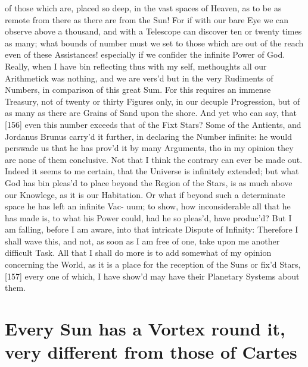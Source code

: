 \documentclass[letterpaper]{book}
\begin{document}
of those which are, placed so deep, in the vast spaces of Heaven, as to be
as remote from there as there are from the Sun! For if with our bare Eye
we can observe above a thousand, and with a Telescope can discover ten or
twenty times as many; what bounds of number must we set to those which
are out of the reach even of these Assistances! especially if we confider
the infinite Power of God. Really, when I have bin reflecting thus with my
self, methoughts all our Arithmetick was nothing, and we are vers'd but
in the very Rudiments of Numbers, in comparison of this great Sum. For
this requires an immense Treasury, not of twenty or thirty Figures only, in
our decuple Progression, but of as many as there are Grains of Sand upon
the shore. And yet who can say, that [156] even this number exceeds that
of the Fixt Stars? Some of the Antients, and Jordanus Brunus carry'd it
further, in declaring the Number infinite: he would perswade us that he has
prov'd it by many Arguments, tho in my opinion they are none of them
conclusive. Not that I think the contrary can ever be made out. Indeed it
seems to me certain, that the Universe is infinitely extended; but what God
has bin pleas'd to place beyond the Region of the Stars, is as much above
our Knowlege, as it is our Habitation.
Or what if beyond such a determinate space he has left an infinite Vac-
uum; to show, how inconsiderable all that he has made is, to what his Power
could, had he so pleas'd, have produc'd? But I am falling, before I am aware,
into that intricate Dispute of Infinity: Therefore I shall wave this, and not,
as soon as I am free of one, take upon me another difficult Task. All that I
shall do more is to add somewhat of my opinion concerning the World, as
it is a place for the reception of the Suns or fix'd Stars, [157] every one of
which, I have show'd may have their Planetary Systems about them.


\section{Every Sun has a Vortex round it, very different from those of Cartes}
\end{document}
